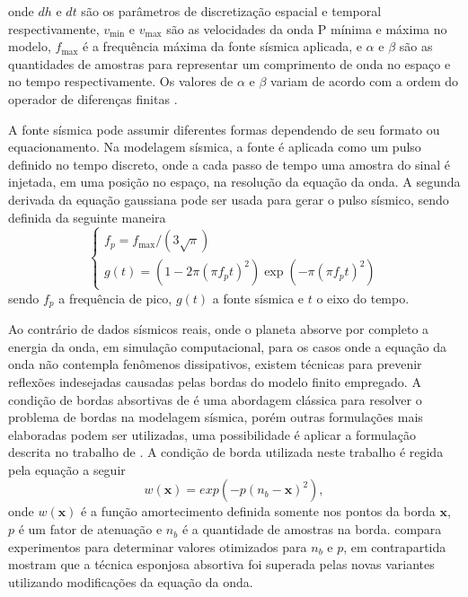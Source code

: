 \noindent onde $dh$ e $dt$ são os parâmetros de discretização espacial e temporal respectivamente, $v_{\text{min}}$ e $v_{\text{max}}$ são as velocidades da onda P mínima e máxima no modelo, $f_{\text{max}}$ é a frequência máxima da fonte sísmica aplicada, e $\alpha$ e $\beta$ são as quantidades de amostras para representar um comprimento de onda no espaço e no tempo respectivamente. Os valores de $\alpha$ e $\beta$ variam de acordo com a ordem do operador de diferenças finitas \cite{bulcao2004modelagem}.    

A fonte sísmica pode assumir diferentes formas dependendo de seu formato ou equacionamento. Na modelagem sísmica, a fonte é aplicada como um pulso definido no tempo discreto, onde a cada passo de tempo uma amostra do sinal é injetada, em uma posição no espaço, na resolução da equação da onda. A segunda derivada da equação gaussiana \cite{ricker1953form} pode ser usada para gerar o pulso sísmico, sendo definida da seguinte maneira
\begin{equation}
	\begin{cases}
		f_p = f_{\text{max}} / (3\sqrt{\pi}) \\
		g(t) = (1 - 2 \pi (\pi f_p t)^2) \exp(-\pi (\pi f_p t)^2)
	\end{cases}
\end{equation}
\noindent sendo $f_p$ a frequência de pico, $g(t)$ a fonte sísmica e $t$ o eixo do tempo. 

Ao contrário de dados sísmicos reais, onde o planeta absorve por completo a energia da onda, em simulação computacional, para os casos onde a equação da onda não contempla fenômenos dissipativos, existem técnicas para prevenir reflexões indesejadas causadas pelas bordas do modelo finito empregado. A condição de bordas absortivas de  é uma abordagem clássica para resolver o problema de bordas na modelagem sísmica, porém outras formulações mais elaboradas podem ser utilizadas, uma possibilidade é aplicar a formulação descrita no trabalho de . A condição de borda utilizada neste trabalho é regida pela equação a seguir
\begin{equation}
	w(\mathbf{x}) = exp(- p(n_b - \mathbf{x})^2),	
\end{equation}      
\noindent onde $w(\mathbf{x})$ é a função amortecimento definida somente nos pontos da borda $\mathbf{x}$, $p$ é um fator de atenuação e $n_b$ é a quantidade de amostras na borda.  compara experimentos para determinar valores otimizados para $n_b$ e $p$, em contrapartida  mostram que a técnica esponjosa absortiva foi superada pelas novas variantes utilizando modificações da equação da onda. 


